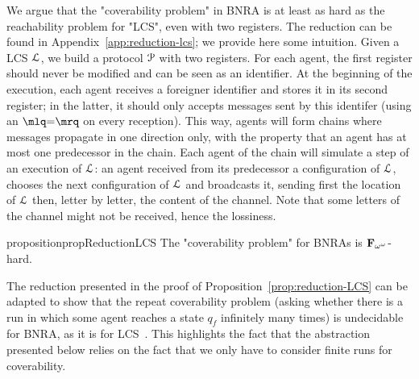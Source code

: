 We argue that the "coverability problem" in BNRA is at least as hard as the reachability problem for "LCS", even with two registers. The reduction can be found in Appendix~\ref{app:reduction-lcs}; we provide here some intuition. Given a LCS $\mathcal{L}$, we build a protocol $\mathcal{P}$ with two registers. For each agent, the first register should never be modified and can be seen as an identifier. At the beginning of the execution, each agent receives a foreigner identifier and stores it in its second register; in the latter, it should only accepts messages sent by this identifer (using an $\quotemarks{\eqtestact}$ on every reception). This way, agents will form chains where messages propagate in one direction only, with the property that an agent has at most one predecessor in the chain. Each agent of the chain will simulate a step of an execution of $\mathcal{L}$: an agent received from its predecessor a configuration of $\mathcal{L}$, chooses the next configuration of $\mathcal{L}$ and broadcasts it, sending first the location of $\mathcal{L}$ then, letter by letter, the content of the channel. Note that some letters of the channel might not be received, hence the lossiness. 

\begin{restatable}{proposition}{propReductionLCS}
	\label{prop:reduction-LCS}
	The "coverability problem" for BNRAs is $\mathbf{F}_{\omega^\omega}$-hard.
\end{restatable}


\begin{remark}
	The reduction presented in the proof of Proposition~\ref{prop:reduction-LCS} can be adapted to show that the repeat coverability problem (asking whether there is a run in which some agent reaches a state $q_f$ infinitely many times) is undecidable for BNRA, as it is for LCS~\cite{AbdullaJ1996undec}. This highlights the fact that the abstraction presented below relies on the fact that we only have to consider finite runs for coverability.
\end{remark}


